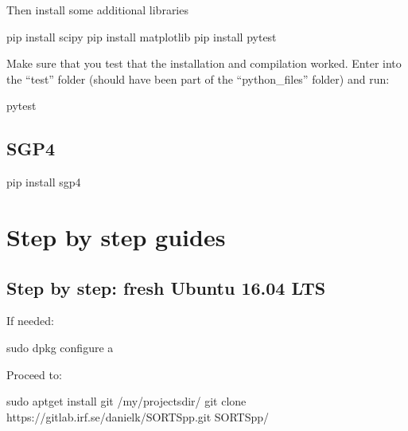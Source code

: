 \documentclass[letterpaper,10pt,english]{sphinxmanual}
\begin{document}
Then install some additional libraries

%
\begin{sphinxVerbatim}[commandchars=\\\{\}]
pip install scipy
pip install matplotlib
pip install pytest
\end{sphinxVerbatim}

Make sure that you test that the installation and compilation worked.
Enter into the “test” folder (should have been part of the “python\_files” folder) and run:

%
\begin{sphinxVerbatim}[commandchars=\\\{\}]
pytest
\end{sphinxVerbatim}


\section{SGP4}
\label{\detokenize{introduction/propagators:sgp4}}
%
\begin{sphinxVerbatim}[commandchars=\\\{\}]
pip install sgp4
\end{sphinxVerbatim}


\chapter{Step by step guides}
\label{\detokenize{introduction/step_by_step:step-by-step-guides}}\label{\detokenize{introduction/step_by_step::doc}}

\section{Step by step: fresh Ubuntu 16.04 LTS}
\label{\detokenize{introduction/step_by_step:step-by-step-fresh-ubuntu-16-04-lts}}
If needed:

%
\begin{sphinxVerbatim}[commandchars=\\\{\}]
sudo dpkg \PYGZhy{}\PYGZhy{}configure \PYGZhy{}a
\end{sphinxVerbatim}

Proceed to:

%
\begin{sphinxVerbatim}[commandchars=\\\{\}]
sudo apt\PYGZhy{}get install git
 /my/projects\PYGZus{}dir/
git clone https://gitlab.irf.se/danielk/SORTSpp.git
 SORTSpp/
\end{sphinxVerbatim}
\end{document}
